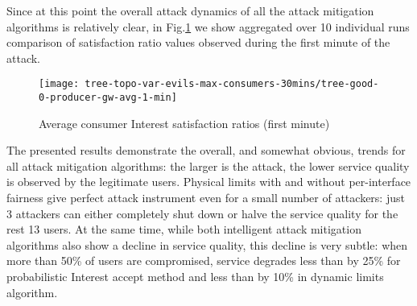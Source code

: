 Since at this point the overall attack dynamics of all the attack mitigation algorithms is relatively clear, in Fig.\ref{fig:small-scale-topo boxplot} we show aggregated over 10 individual runs comparison of satisfaction ratio values observed during the first minute of the attack.

\begin{figure}[htbp]
  \centering
  \texttt{[image: tree-topo-var-evils-max-consumers-30mins/tree-good-0-producer-gw-avg-1-min]}
  \caption{Average consumer Interest satisfaction ratios (first minute)}
  \label{fig:small-scale-topo boxplot}
\end{figure}

The presented results demonstrate the overall, and somewhat obvious, trends for all attack mitigation algorithms: the larger is the attack, the lower service quality is observed by the legitimate users.
Physical limits with and without per-interface fairness give perfect attack instrument even for a small number of attackers: just 3 attackers can either completely shut down or halve the service quality for the rest 13 users.
At the same time, while both intelligent attack mitigation algorithms also show a decline in service quality, this decline is very subtle: when more than 50\% of users are compromised, service degrades less than by 25\% for probabilistic Interest accept method and less than by 10\% in dynamic limits algorithm.




